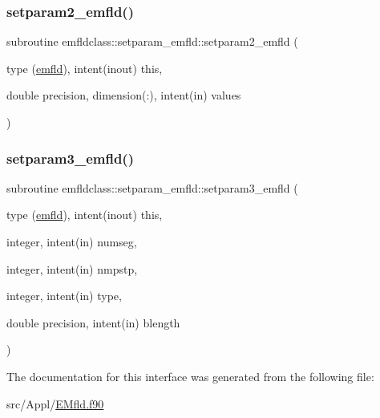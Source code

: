 \mbox{\label{interfaceemfldclass_1_1setparam__emfld_afb0e96a0e5788aa271862d01ec1fc98f}} 
\subsubsection{\texorpdfstring{setparam2\_emfld()}{setparam2\_emfld()}}
{\footnotesize\ttfamily subroutine emfldclass\+::setparam\+\_\+emfld\+::setparam2\+\_\+emfld (\begin{DoxyParamCaption}\item[{type (\mbox{\hyperlink{namespaceemfldclass_structemfldclass_1_1emfld}{emfld}}), intent(inout)}]{this,  }\item[{double precision, dimension(\+:), intent(in)}]{values }\end{DoxyParamCaption})}

\mbox{\label{interfaceemfldclass_1_1setparam__emfld_a044636428677fbc55c9213a08e835463}} 
\subsubsection{\texorpdfstring{setparam3\_emfld()}{setparam3\_emfld()}}
{\footnotesize\ttfamily subroutine emfldclass\+::setparam\+\_\+emfld\+::setparam3\+\_\+emfld (\begin{DoxyParamCaption}\item[{type (\mbox{\hyperlink{namespaceemfldclass_structemfldclass_1_1emfld}{emfld}}), intent(inout)}]{this,  }\item[{integer, intent(in)}]{numseg,  }\item[{integer, intent(in)}]{nmpstp,  }\item[{integer, intent(in)}]{type,  }\item[{double precision, intent(in)}]{blength }\end{DoxyParamCaption})}



The documentation for this interface was generated from the following file\+:\begin{DoxyCompactItemize}
\item 
src/\+Appl/\mbox{\hyperlink{_e_mfld_8f90}{E\+Mfld.\+f90}}\end{DoxyCompactItemize}
